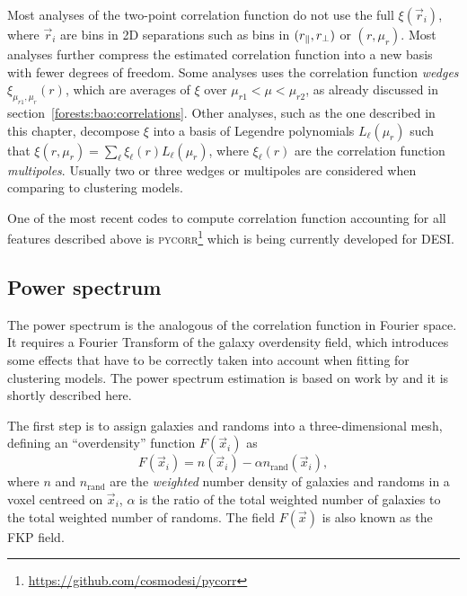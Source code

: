 Most analyses of the two-point correlation function do not use the full $\xi(\vec{r}_i)$,
where $\vec{r}_i$ are bins in 2D separations such as bins in $({r_\parallel}, {r_\perp})$ or $(r, \mu_r)$.
Most analyses further compress the estimated correlation function into a new basis with fewer 
degrees of freedom. Some analyses uses the correlation function 
\emph{wedges} $\xi_{\mu_{r1}, \mu_{r}}(r)$, which are 
averages of $\xi$ over $\mu_{r1} < \mu < \mu_{r2}$, as already discussed in section~\ref{forests:bao:correlations}. 
Other analyses, such as the one described in this chapter, decompose $\xi$ into a basis of 
Legendre polynomials $L_\ell(\mu_r)$ such that $\xi(r, \mu_r) = \sum_\ell \xi_\ell(r) L_\ell(\mu_r)$, 
where $\xi_\ell(r)$ are the correlation function \emph{multipoles}. 
Usually two or three wedges or multipoles are considered when comparing to clustering models.  

One of the most recent codes to compute correlation function accounting for all 
features described above is 
\textsc{pycorr}\footnote{\url{https://github.com/cosmodesi/pycorr}} 
which is being currently developed for DESI.

\subsection{Power spectrum}
\label{galaxies:clustering:power_spectrum}

The power spectrum is the analogous of the correlation function in Fourier space. 
It requires a Fourier Transform of the galaxy overdensity field, which introduces 
some effects that have to be correctly taken into account when fitting for clustering models. 
The power spectrum estimation is based on work by 
\cite{feldmanPowerSpectrumAnalysisThreedimensional1994,
bianchiMeasuringLineofsightdependentFourierspace2015,
handOptimalFFTbasedAnisotropic2017} and it is shortly described here. 

The first step is to assign galaxies and randoms into a three-dimensional mesh, 
defining an ``overdensity'' function $F(\vec{x}_i)$ as 
\begin{equation}
    F(\vec{x}_i) =  n(\vec{x}_i) - \alpha n_\text{rand}(\vec{x}_i),
    \label{eq:overdensity_fourier}
\end{equation}
where  $n$ and $n_\text{rand}$ are the \emph{weighted} number density of galaxies and randoms 
in a voxel centreed on $\vec{x}_i$, $\alpha$ is the ratio of the total weighted number of galaxies 
to the total weighted number of randoms. 
The field $F(\vec{x})$ is also known as the FKP field. 

